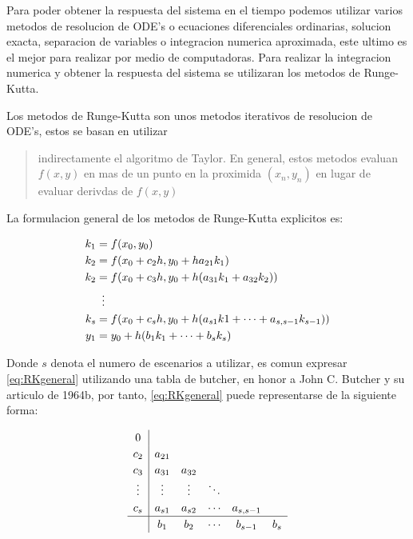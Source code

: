         Para poder obtener la respuesta del sistema en el tiempo podemos utilizar varios metodos de resolucion de ODE's o ecuaciones diferenciales ordinarias, solucion exacta, separacion de variables o integracion numerica aproximada, este ultimo es el mejor para realizar por medio de computadoras. Para realizar la integracion numerica y obtener la respuesta del sistema se utilizaran los metodos de Runge-Kutta.

        Los metodos de Runge-Kutta son unos metodos iterativos de resolucion de ODE's, estos se basan en utilizar \blockquote[{\cite[p.31]{horacio1997metodos}}]{indirectamente el algoritmo de Taylor. En general, estos metodos evaluan $f(x,y)$ en mas de un punto en la proximida $(x_n,y_n)$ en lugar de evaluar derivdas de $f(x,y)$}. La formulacion general de los metodos de Runge-Kutta explicitos es:
        
        \begin{equation}\label{eq:RKgeneral}
            \begin{aligned}
                k_1 &= f(x_0,y_0)\\
                k_2 &= f(x_0 + c_2 h,y_0 + ha_{21}k_1)\\
                k_2 &= f(x_0 + c_3 h,y_0 + h(a_{31}k_1 + a_{32}k_2))\\
                &\mathrel{\makebox[\widthof{=}]{\vdots}}\\
                k_s &= f(x_0 + c_s h,y_0 + h(a_{s1}k1 + \cdots +  a_{s,s-1}k_{s-1}))\\
                y_1 &= y_0 + h(b_1 k_1 + \cdots + b_s k_s)
            \end{aligned}
        \end{equation}
        
        Donde $s$ denota el numero de escenarios a utilizar, es comun expresar \cref{eq:RKgeneral} utilizando una tabla de butcher, en honor a John C. Butcher y su articulo de 1964b, por tanto, \cref{eq:RKgeneral} puede representarse de la siguiente forma:

        \begin{equation}\label{eq:explicitoButcher}
            \renewcommand\arraystretch{1.2}
            \begin{array}
            {c|ccccc}
            0\\
            c_2 & a_{21}\\
            c_3 & a_{31} & a_{32}\\
            \vdots & \vdots & \vdots & \ddots\\
            c_s & a_{s1} & a_{s2} & \cdots & a_{s,s-1}\\
            \hline
            & b_1 & b_2 & \cdots & b_{s-1} &  b_{s}
            \end{array}
        \end{equation}

